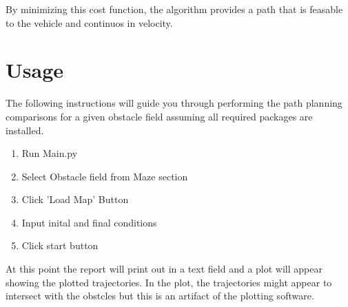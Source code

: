\documentclass{article}
\begin{document}
        By minimizing this cost function, the algorithm provides a path that is feasable to the vehicle and continuos in velocity. 

\section{Usage}
    The following instructions will guide you through performing the path planning comparisons for a given obstacle field assuming all required packages are installed.

    \begin{enumerate}
        \item Run Main.py
        \item Select Obstacle field from Maze section
        \item Click 'Load Map' Button
        \item Input inital and final conditions
        \item Click start button
    \end{enumerate}

    At this point the report will print out in a text field and a plot will appear showing the plotted trajectories. In the plot, the trajectories might appear to intersect with the obstcles but this is an artifact of the plotting software.

\printbibliography
\end{document}
